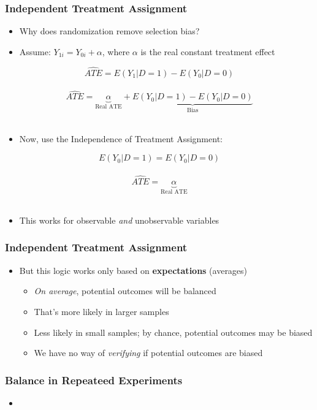 \documentclass[xcolor=x11names,compress]{beamer}\usepackage[]{graphicx}\usepackage[]{color}
\renewcommand{\(}{\begin{columns}}
\renewcommand{\)}{\end{columns}}
\newcommand{\<}[1]{\begin{column}{#1}}
\renewcommand{\>}{\end{column}}
\begin{document}
\begin{frame}
\frametitle{Independent Treatment Assignment}
\begin{itemize}
\item Why does randomization remove selection bias?
\item Assume: $Y_{1i} = Y_{0i} + \alpha$, where $\alpha$ is the real constant treatment effect
\end{itemize}
$$ \hat{ATE} = E(Y_1|D=1) - E(Y_0|D=0)$$ \\ \pause
$$ \hat{ATE} = \underbrace{\alpha}_\text{Real ATE} + \underbrace{E(Y_0|D=1) - E(Y_0|D=0)}_\text{Bias}$$ \\
\begin{itemize}
\item Now, use the Independence of Treatment Assignment:
\end{itemize}
$$ E(Y_0|D=1) = E(Y_0|D=0)$$ \\
$$ \hat{ATE} = \underbrace{\alpha}_\text{Real ATE} $$ \\
\begin{itemize}
\item This works for observable \textit{and} unobservable variables
\end{itemize}
\end{frame}

\begin{frame}
\frametitle{Independent Treatment Assignment}
\begin{itemize}
\item But this logic works only based on \textbf{expectations} (averages)
\pause
\begin{itemize}
\item \textit{On average}, potential outcomes will be balanced
\pause
\item That's more likely in larger samples
\pause
\item Less likely in small samples; by chance, potential outcomes may be biased
\pause
\item We have no way of \textit{verifying} if potential outcomes are biased
\end{itemize}
\end{itemize}
\end{frame}

\begin{frame}
\frametitle{Balance in Repeateed Experiments}
\begin{itemize}
\item 
\end{itemize}
\end{frame}
\end{document}
